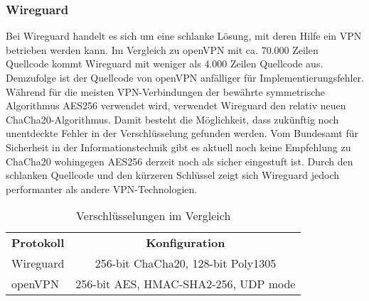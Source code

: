 \subsubsection{Wireguard}

Bei Wireguard handelt es sich um eine schlanke L\"osung, mit deren Hilfe ein \ac{VPN} betrieben werden kann. Im Vergleich zu openVPN mit ca. 70.000 Zeilen Quellcode kommt Wireguard mit weniger als 4.000 Zeilen Quellcode aus. 
Demzufolge ist der Quellcode von openVPN anf\"alliger f\"ur Implementierungsfehler. W\"ahrend f\"ur die meisten VPN-Verbindungen der bew\"ahrte symmetrische Algorithmus AES256 verwendet wird, verwendet Wireguard den relativ neuen ChaCha20-Algorithmus. Damit besteht die M\"oglichkeit, dass zuk\"unftig noch unentdeckte Fehler in der Verschl\"usselung gefunden werden. Vom Bundesamt f\"ur Sicherheit in der Informationstechnik gibt es aktuell noch keine Empfehlung zu ChaCha20 wohingegen AES256 derzeit noch als sicher eingestuft ist.  
Durch den schlanken Quellcode und den k\"urzeren Schl\"ussel zeigt sich Wireguard jedoch performanter als andere VPN-Technologien.   

\begin{table}[ht]
   \begin{center}
      \begin{tabular}{lc}\toprule
         \textbf{Protokoll}	&\textbf{Konfiguration} \\ 	
         Wireguard	& 256-bit ChaCha20, 128-bit Poly1305 \\
         openVPN	& 256-bit AES, HMAC-SHA2-256, UDP mode \\
      \end{tabular}
   \end{center}
   \caption{Verschlüsselungen im Vergleich}
\end{table}

